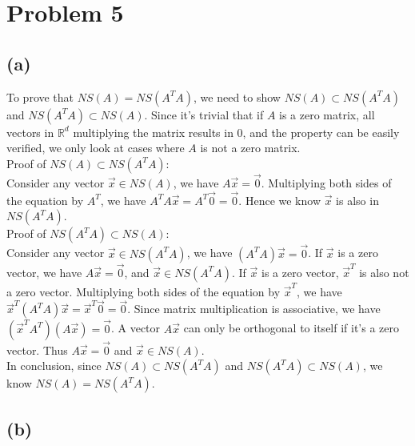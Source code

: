 \documentclass[11pt]{article}
\begin{document}
\newpage
\section*{Problem 5}
\subsection*{(a)}
To prove that $NS(A)=NS(A^TA)$, we need to show $NS(A)\subset NS(A^TA)$ and $NS(A^TA)\subset NS(A)$. Since it's trivial that if $A$ is a zero matrix, all vectors in $\mathbb{R}^d$ multiplying the matrix results in $0$, and the property can be easily verified, we only look at cases where $A$ is not a zero matrix. \\

Proof of $NS(A)\subset NS(A^TA)$: \\
Consider any vector $\Vec{x} \in NS(A)$, we have $A\Vec{x} = \Vec{0}$. Multiplying both sides of the equation by $A^T$, we have $A^TA\Vec{x} = A^T \Vec{0} = \Vec{0}$. Hence we know $\Vec{x}$ is also in $NS(A^TA)$.\\

Proof of $NS(A^TA) \subset NS(A)$: \\
Consider any vector $\Vec{x} \in NS(A^TA)$, we have $(A^TA) \Vec{x} = \Vec{0}$. If $\Vec{x}$ is a zero vector, we have $A \Vec{x} = \Vec{0}$, and $\Vec{x} \in NS(A^TA)$. If $\Vec{x}$ is a zero vector, $\Vec{x}^T$ is also not a zero vector. Multiplying both sides of the equation by $\Vec{x}^T$, we have $\Vec{x}^T (A^TA) \Vec{x} = \Vec{x}^T \Vec{0} = \Vec{0}$. Since matrix multiplication is associative, we have $(\Vec{x}^TA^T) (A\Vec{x}) = \Vec{0}$. A vector $A\Vec{x}$ can only be orthogonal to itself if it's a zero vector. Thus $A\Vec{x} = \Vec{0}$ and $\Vec{x} \in NS(A)$.\\

In conclusion, since $NS(A)\subset NS(A^TA)$ and $NS(A^TA)\subset NS(A)$, we know $NS(A)=NS(A^TA)$.

\subsection*{(b)}

\end{document}
